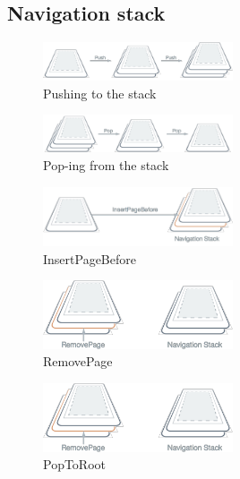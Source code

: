 \documentclass{article}
\begin{document}
\subsection{Navigation stack}

\begin{figure}[H]
    \centering
    \includegraphics[width=0.5\textwidth]{navigation-stack-1.png}
    \caption{Pushing to the stack}
\end{figure}


\begin{figure}[H]
    \centering
    \includegraphics[width=0.5\textwidth]{navigation-stack-2.png}
    \caption{Pop-ing from the stack}
\end{figure}

\begin{figure}[H]
    \centering
    \includegraphics[width=0.5\textwidth]{navigation-stack-3.png}
    \caption{InsertPageBefore}
\end{figure}

\begin{figure}[H]
    \centering
    \includegraphics[width=0.5\textwidth]{navigation-stack-4.png}
    \caption{RemovePage}
\end{figure}


\begin{figure}[H]
    \centering
    \includegraphics[width=0.5\textwidth]{navigation-stack-4.png}
    \caption{PopToRoot}
\end{figure}
\end{document}
